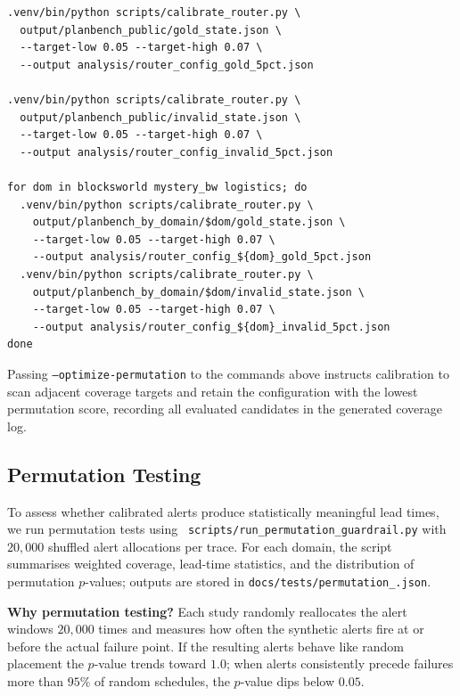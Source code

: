 \documentclass[11pt]{article}
\begin{document}
\begin{lstlisting}[style=stm, caption={Router calibration commands.}, label={lst:calibration}]
.venv/bin/python scripts/calibrate_router.py \
  output/planbench_public/gold_state.json \
  --target-low 0.05 --target-high 0.07 \
  --output analysis/router_config_gold_5pct.json

.venv/bin/python scripts/calibrate_router.py \
  output/planbench_public/invalid_state.json \
  --target-low 0.05 --target-high 0.07 \
  --output analysis/router_config_invalid_5pct.json

for dom in blocksworld mystery_bw logistics; do
  .venv/bin/python scripts/calibrate_router.py \
    output/planbench_by_domain/$dom/gold_state.json \
    --target-low 0.05 --target-high 0.07 \
    --output analysis/router_config_${dom}_gold_5pct.json
  .venv/bin/python scripts/calibrate_router.py \
    output/planbench_by_domain/$dom/invalid_state.json \
    --target-low 0.05 --target-high 0.07 \
    --output analysis/router_config_${dom}_invalid_5pct.json
done
\end{lstlisting}

Passing \texttt{--optimize-permutation} to the commands above instructs
calibration to scan adjacent coverage targets and retain the configuration with
the lowest permutation score, recording all evaluated candidates in the
generated coverage log.

\subsection{Permutation Testing}
\label{subsec:permutation}
To assess whether calibrated alerts produce statistically meaningful lead times,
we run permutation tests using \
\texttt{scripts/run\_permutation\_guardrail.py} with $20{,}000$ shuffled alert
allocations per trace. For each domain, the script summarises weighted coverage,
lead-time statistics, and the distribution of permutation $p$-values; outputs are
stored in \texttt{docs/tests/permutation\_\*.json}.

\noindent\textbf{Why permutation testing?} Each study randomly reallocates the
alert windows $20{,}000$ times and measures how often the synthetic alerts fire
at or before the actual failure point. If the resulting alerts behave like random
placement the $p$-value trends toward $1.0$; when alerts consistently precede
failures more than $95\%$ of random schedules, the $p$-value dips below $0.05$.
\end{document}
